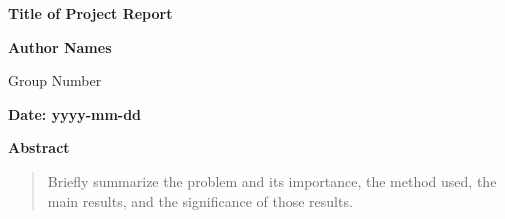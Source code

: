 \documentclass[UTF8,a4paper,11pt,twoside]{ctexart}
\theoremstyle{definition}
\newcommand{\ProjectTitle}{Title of Project Report}
\newcommand{\GroupNumber}{Group Number}
\newcommand{\StudentNames}{Author Names}
\newcommand{\ProjectDate}{yyyy-mm-dd}
\renewenvironment{abstract}{%
  \begin{center}
    {\bfseries\fontsize{14pt}{17pt}\selectfont Abstract\par}
  \end{center}
  \begin{quotation}\normalsize
}{%
  \end{quotation}
}
\begin{document}
\begin{center}
  \vspace*{0.3cm}
  {\titlefont\bfseries\fontsize{20pt}{25pt}\selectfont
    \ProjectTitle\par}

  \vspace{1.2cm}
  {\titlefont\bfseries\fontsize{13pt}{17pt}\selectfont
    \StudentNames\par}

  \vspace{0.25cm}
  {\titlefont\fontsize{11pt}{14pt}\selectfont
    \GroupNumber\par}

  \vspace{0.9cm}
  {\titlefont\bfseries\fontsize{12pt}{15pt}\selectfont
    Date: \ProjectDate\par}
\end{center}

\vspace{0.8cm}

\begin{abstract}
Briefly summarize the problem and its importance, the method used, the main
results, and the significance of those results.
\end{abstract}

\clearpage
\tableofcontents
\clearpage











\end{document}
